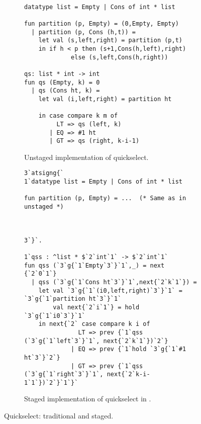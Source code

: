 
\begin{figure*}
\begin{subfigure}[t]{0.45\textwidth}
\begin{lstlisting} 

datatype list = Empty | Cons of int * list

fun partition (p, Empty) = (0,Empty, Empty) 
  | partition (p, Cons (h,t)) = 
    let val (s,left,right) = partition (p,t) 
    in if h < p then (s+1,Cons(h,left),right) 
             else (s,left,Cons(h,right))

qs: list * int -> int
fun qs (Empty, k) = 0
  | qs (Cons ht, k) =
    let val (i,left,right) = partition ht

    in case compare k m of
         LT => qs (left, k)
       | EQ => #1 ht
       | GT => qs (right, k-i-1)
\end{lstlisting}
\caption{Unstaged implementation of quickselect.}
\label{fig:qs-unstaged}
\end{subfigure}
\hfill
\begin{subfigure}[t]{0.55\textwidth}
\begin{lstlisting} 
3`atsigng{`  
1`datatype list = Empty | Cons of int * list

fun partition (p, Empty) = ...  (* Same as in unstaged *)



3`}`.

1`qss : ^list * $`2`int`1` -> $`2`int`1`
fun qss (`3`g{`1`Empty`3`}`1`,_) = next {`2`0`1`}
  | qss (`3`g{`1`Cons ht`3`}`1`,next{`2`k`1`}) = 
    let val `3`g{`1`(i0,left,right)`3`}`1` = `3`g{`1`partition ht`3`}`1`
        val next{`2`i`1`} = hold `3`g{`1`i0`3`}`1`
    in next{`2` case compare k i of
               LT => prev {`1`qss (`3`g{`1`left`3`}`1`, next{`2`k`1`})`2`}
             | EQ => prev {`1`hold `3`g{`1`#1 ht`3`}`2`}
             | GT => prev {`1`qss (`3`g{`1`right`3`}`1`, next{`2`k-i-1`1`})`2`}`1`}`
\end{lstlisting}
\caption{Staged implementation of quickselect in \lang.}

\label{fig:qs-staged}
\end{subfigure}
\caption{Quickselect: traditional and staged.}
\end{figure*}

